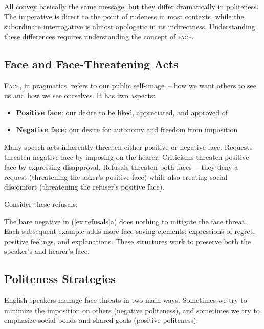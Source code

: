 All convey basically the same message, but they differ dramatically in politeness. The imperative is direct to the point of rudeness in most contexts, while the subordinate interrogative is almost apologetic in its indirectness. Understanding these differences requires understanding the concept of \textsc{face}.

\subsection{Face and Face-Threatening Acts}

\textsc{Face}, in pragmatics, refers to our public self-image~-- how we want others to see us and how we see ourselves. It has two aspects:
\begin{itemize}[noitemsep]
    \item \textbf{Positive face}: our desire to be liked, appreciated, and approved of
    \item \textbf{Negative face}: our desire for autonomy and freedom from imposition
\end{itemize}

Many speech acts inherently threaten either positive or negative face. Requests threaten negative face by imposing on the hearer. Criticisms threaten positive face by expressing disapproval. Refusals threaten both faces~-- they deny a request (threatening the asker's positive face) while also creating social discomfort (threatening the refuser's positive face).

Consider these refusals:
\ea \label{ex:refusals}
    \z
\z

The bare negative in (\ref{ex:refusals}a) does nothing to mitigate the face threat. Each subsequent example adds more face-saving elements: expressions of regret, positive feelings, and explanations. These structures work to preserve both the speaker's and hearer's face.

\subsection{Politeness Strategies}

English speakers manage face threats in two main ways. Sometimes we try to minimize the imposition on others (negative politeness), and sometimes we try to emphasize social bonds and shared goals (positive politeness).

